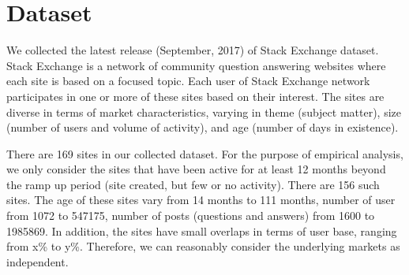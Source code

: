 \section{Dataset} 
We collected the latest release (September, 2017) of Stack Exchange dataset. Stack Exchange is a network of community question answering websites where each site is based on a focused topic. Each user of Stack Exchange network participates in one or more of these sites based on their interest. The sites are diverse in terms of market characteristics, varying in theme (subject matter), size (number of users and volume of activity), and age (number of days in existence). 

There are 169 sites in our collected dataset. For the purpose of empirical analysis, we only consider the sites that have been active for at least 12 months beyond the ramp up period (site created, but few or no activity). There are 156 such sites. The age of these sites vary from 14 months to 111 months, number of user from 1072 to 547175, number of posts (questions and answers) from 1600 to 1985869. In addition, the sites have small overlaps in terms of user base, ranging from x\% to y\%. Therefore, we can reasonably consider the underlying markets as independent.

